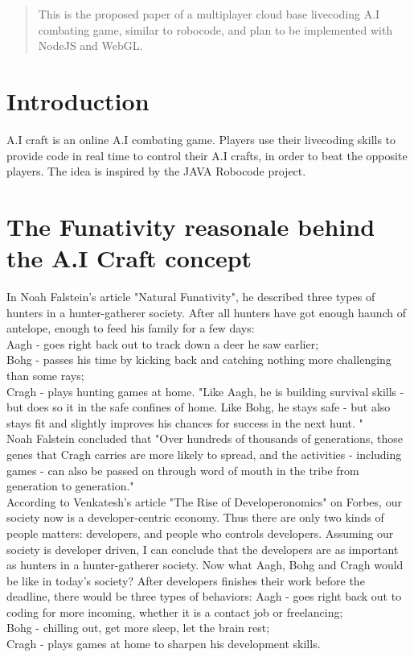 \documentclass[12pt]{article}
\begin{document}
\maketitle

\begin{abstract}
This is the proposed paper of a multiplayer cloud base livecoding A.I combating game, similar to robocode, and plan to be implemented with NodeJS and WebGL.
\end{abstract}

\section{Introduction}
A.I craft is an online A.I combating game. Players use their livecoding skills to provide code in real time to control their A.I crafts, in order to beat the opposite players. The idea is inspired by the JAVA Robocode\cite{robocode01} project.

\section{The Funativity reasonale behind the A.I Craft concept}
In Noah Falstein's article "Natural Funativity"\cite{noah2004}, he described three types of hunters in a hunter-gatherer society. After all hunters have got enough haunch of antelope, enough to feed his family for a few days:\\
Aagh - goes right back out to track down a deer he saw earlier;\\
Bohg - passes his time by kicking back and catching nothing more challenging than some rays;\\
Cragh - plays hunting games at home. "Like Aagh, he is building survival skills - but does so it in the safe confines of home. Like Bohg, he stays safe - but also stays fit and slightly improves his chances for success in the next hunt. "\\
Noah Falstein concluded that "Over hundreds of thousands of generations, those genes that Cragh carries are more likely to spread, and the activities - including games - can also be passed on through word of mouth in the tribe from generation to generation."\\

According to Venkatesh's article "The Rise of Developeronomics"\cite{venkatesh2011} on Forbes, our society now is a developer-centric economy. Thus there are only two kinds of people matters: developers, and people who controls developers. Assuming our society is developer driven, I can conclude that the developers are as important as hunters in a hunter-gatherer society. Now what Aagh, Bohg and Cragh would be like in today's society? After developers finishes their work before the deadline, there would be three types of behaviors:
Aagh - goes right back out to coding for more incoming, whether it is a contact job or freelancing;\\
Bohg - chilling out, get more sleep, let the brain rest;\\
Cragh - plays games at home to sharpen his development skills.\\ 
\end{document}
